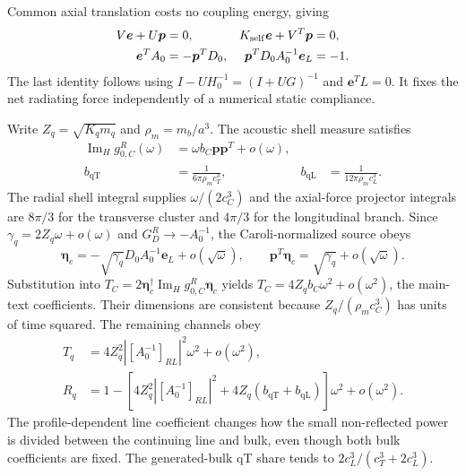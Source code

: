 \documentclass[10pt,aps,onecolumn,notitlepage,nofootinbib]{revtex4-2}
\newcommand{\veta}{\bm\eta}
\newcommand{\qT}{\mathrm{qT}}
\newcommand{\qL}{\mathrm{qL}}
\newcommand{\ImH}{\operatorname{Im}_{\!H}}
\begin{document}
Common axial translation costs no coupling energy, giving
\begin{align}
 V\bm e+U\bm p&=0,
 &K_{\rm self}\bm e+V^T\bm p&=0,\nonumber\\
 \bm e^TA_0&=-\bm p^TD_0,
 &\bm p^TD_0A_0^{-1}\bm e_L&=-1.
 \label{pred:sm-eq-resultant}
\end{align}
The last identity follows using $I-UH_0^{-1}=(I+UG)^{-1}$ and $\bm e^TL=0$. It fixes the net radiating force independently of a numerical static compliance.

Write $Z_q=\sqrt{K_qm_q}$ and $\rho_m=m_b/a^3$. The acoustic shell measure satisfies
\begin{align}
 \ImH g_{0,C}^R(\omega)&=\omega b_C\bm p\bm p^T+o(\omega),\nonumber\\
 b_{\qT}&=\frac{1}{6\pi\rho_m c_T^3},
 &b_{\qL}&=\frac{1}{12\pi\rho_m c_L^3}.
 \label{pred:sm-eq-spectral}
\end{align}
The radial shell integral supplies $\omega/(2c_C^3)$ and the axial-force projector integrals are $8\pi/3$ for the transverse cluster and $4\pi/3$ for the longitudinal branch. Since $\gamma_q=2Z_q\omega+o(\omega)$ and $G_D^R\to-A_0^{-1}$, the Caroli-normalized source obeys
\begin{equation}
 \veta_c=-\sqrt{\gamma_q}D_0A_0^{-1}\bm e_L+o(\sqrt\omega),
 \qquad
 \bm p^T\veta_c=\sqrt{\gamma_q}+o(\sqrt\omega).
\end{equation}
Substitution into $T_C=2\veta_c^\dagger\ImH g_{0,C}^R\veta_c$ yields $T_C=4Z_qb_C\omega^2+o(\omega^2)$, the main-text coefficients. Their dimensions are consistent because $Z_q/(\rho_m c_C^3)$ has units of time squared. The remaining channels obey
\begin{align}
 T_q&=4Z_q^2|[A_0^{-1}]_{RL}|^2\omega^2+o(\omega^2),\nonumber\\
 R_q&=1-\left[4Z_q^2|[A_0^{-1}]_{RL}|^2
 +4Z_q(b_{\qT}+b_{\qL})\right]\omega^2+o(\omega^2).
 \label{pred:sm-eq-line-limit}
\end{align}
The profile-dependent line coefficient changes how the small non-reflected power is divided between the continuing line and bulk, even though both bulk coefficients are fixed. The generated-bulk qT share tends to $2c_L^3/(c_T^3+2c_L^3)$.
\end{document}
